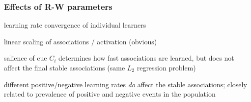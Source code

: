 \begin{frame}
  \frametitle{Effects of R-W parameters}

  \begin{description}
  \item<1->[$\beta > 0$:] learning rate \so convergence of individual learners
  \item<2->[$\lambda \neq 1$:]\gap[.5] linear scaling of associations / activation (obvious)
  \item<3->[$\alpha_i\neq 1$:]\gap[.5] salience of cue $C_i$ determines how fast associations are learned, but does not affect the final stable associations (same $L_2$ regression problem)
  \item<4->[$\beta_1 \neq \beta_2$:]\gap[.5] different positive/negative learning rates \emph{do} affect the stable associations; closely related to prevalence of positive and negative events in the population
  \end{description}
\end{frame}


